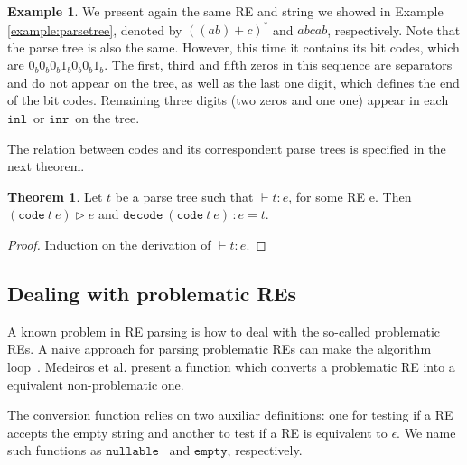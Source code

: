 \documentclass[review]{elsarticle}
\newcommand{\inl}{\ensuremath{\texttt{inl}}}
\newcommand{\inr}{\ensuremath{\texttt{inr}}}
\newcommand{\code}{\ensuremath{\texttt{code}}}
\newcommand{\decodee}{\ensuremath{\texttt{decode}}}
\newcommand{\nullable}{\ensuremath{\texttt{nullable}}}
\newcommand{\emptyy}{\ensuremath{\texttt{empty}}}
\theoremstyle{definition}
\newtheorem{Theorem}{Theorem}
\newtheorem{Example}{Example}
\begin{document}
\begin{Example}
We present again the same RE and string we showed in Example \ref{example:parsetree},
denoted by $((ab) + c)^*$ and $abcab$, respectively. Note that the parse tree is also the same.
However, this time it contains its bit codes, which are $0_b0_b0_b1_b0_b0_b1_b$. The first, third and fifth
zeros in this sequence are separators and do not appear on the tree, as well as the last one
digit, which defines the end of the bit codes. Remaining three digits (two zeros and one one)
appear in each $\inl\,$ or $\inr\,$ on the tree.

\begin{center}
\end{center}

\end{Example}


The relation between codes and its correspondent parse trees is specified in the next
theorem.

\begin{Theorem}
  Let $t$ be a parse tree such that $\vdash t : e$, for some RE e. Then $(\code\: t\: e) \rhd e$ and
  $\decodee\:(\code\: t\: e)\,: e = t$.
\end{Theorem}
\begin{proof}
  Induction on the derivation of $\vdash t : e$.
\end{proof}


\subsection{Dealing with problematic REs}\label{subsection:problematic}

A known problem in RE parsing is how to deal with the so-called problematic REs. A naive approach for 
parsing problematic REs can make the algorithm loop~\cite{Frisch2004}. Medeiros et al. \cite{Medeiros14}
present a function which converts a problematic RE into a equivalent non-problematic one.

The conversion function relies on two auxiliar definitions: one for testing if a RE accepts the empty string and 
another to test if a RE is equivalent to $\epsilon$. We name such functions as \nullable~ and \emptyy, 
respectively.
\end{document}
